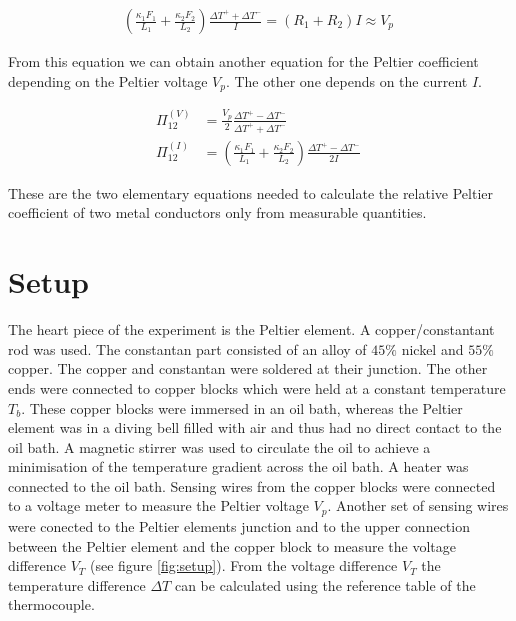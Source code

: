\documentclass[a4paper]{article}
\begin{document}
\begin{subequations}
\begin{align}
\left( \frac{\kappa_1 F_1}{L_1} + \frac{\kappa_2 F_2}{L_2} \right) \frac{\Delta T^{+} + \Delta T^{-}}{I} = \left( R_1 + R_2 \right) I \approx V_p \ \label{eq:adding}
\end{align}
\end{subequations}

From this equation we can obtain another equation for the Peltier coefficient depending on the Peltier voltage $V_p$. The other one depends on the current $I$.

\begin{subequations}
\begin{align}
\Pi_{12}^{(V)} &= \frac{V_p}{2} \frac{\Delta T^{+} - \Delta T^{-}}{\Delta T^{+} + \Delta T^{-}} \ \label{eq:pi12v} \\
\Pi_{12}^{(I)} &= \left( \frac{\kappa_1 F_1}{L_1} + \frac{\kappa_2 F_2}{L_2} \right) \frac{\Delta T^{+} - \Delta T^{-}}{2 I} \ \label{eq:pi12i}
\end{align}
\end{subequations}

These are the two elementary equations needed to calculate the relative Peltier coefficient of two metal conductors only from measurable quantities.

\section{Setup}

The heart piece of the experiment is the Peltier element. A copper/constantant rod was used. The constantan part consisted of an alloy of $45\%$ nickel and $55\%$ copper. The copper and constantan were soldered at their junction. The other ends were connected to copper blocks which were held at a constant temperature $T_b$. These copper blocks were immersed in an oil bath, whereas the Peltier element was in a diving bell filled with air and thus had no direct contact to the oil bath. A magnetic stirrer was used to circulate the oil to achieve a minimisation of the temperature gradient across the oil bath. A heater was connected to the oil bath. Sensing wires from the copper blocks were connected to a voltage meter to measure the Peltier voltage $V_p$. Another set of sensing wires were conected to the Peltier elements junction and to the upper connection between the Peltier element and the copper block to measure the voltage difference $V_T$ (see figure \ref{fig:setup}). From the voltage difference $V_T$ the temperature difference $\Delta T$ can be calculated using the reference table of the thermocouple.
\end{document}
